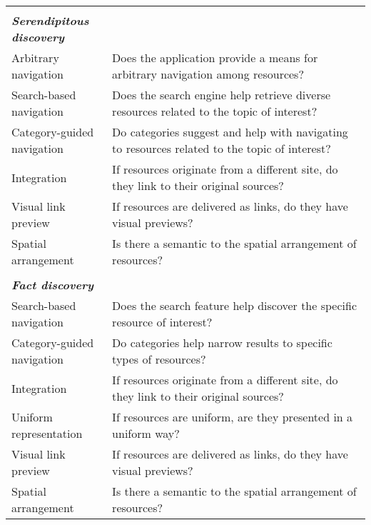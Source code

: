 \documentclass{casconpaper}
\begin{document}
{{\begin{table*}[htbp]
\begin{tabular}{|p{0.28\linewidth}|p{0.72\linewidth}|}
&\\
\emph{\textbf{Serendipitous discovery}}     &                                                                                                           \\

Arbitrary navigation         & Does the application provide a means for arbitrary navigation among resources?                              \\
Search-based navigation      & Does the search engine help retrieve diverse resources related to the topic of interest?               \\
Category-guided navigation & Do categories suggest and help with navigating to resources related to the topic of interest?           \\
Integration                  & If resources originate from a different site, do they link to their original sources?                   \\
Visual link preview               & If resources are delivered as links, do they have visual previews?                                                                        \\
Spatial arrangement          & Is there a semantic to the spatial arrangement of resources?                                                    \\
&\\
\emph{\textbf{Fact discovery}}                &                                                                                                           \\
Search-based navigation      & Does the search feature help discover the specific resource of interest?                                  \\
Category-guided navigation & Do categories help narrow results to specific types of resources?                                   \\
Integration                  & If resources originate from a different site, do they link to their original sources?                   \\
Uniform representation       & If resources are uniform, are they presented in a uniform way? \\
Visual link preview               & If resources are delivered as links, do they have visual previews?                                                                        \\
Spatial arrangement          & Is there a semantic to the spatial arrangement of resources?                                                    \\

\end{tabular}
\end{table*}}}
\end{document}
